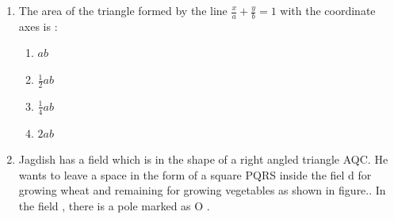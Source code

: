 %
\begin{enumerate}
        \item The area of the triangle formed by the line $ \frac{x}{a} + \frac{y}{b} = 1 $ with the coordinate axes is :
        \begin{enumerate}
             \item  $ ab $
             \item  $\frac{1}{2}ab$
             \item  $\frac{1}{4}ab$
             \item  $2ab$
        \end{enumerate}
	\item Jagdish has a field which is in the shape of a right angled triangle AQC. He wants to leave a space in the form of a square PQRS inside the fiel
d for growing wheat and remaining for growing vegetables as shown in figure.. In the field , there is a pole marked as O .


\end{enumerate}
